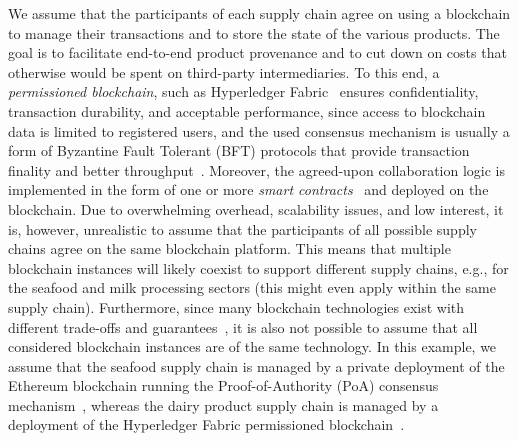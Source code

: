 \documentclass[review]{elsarticle}
\begin{document}
We assume that the participants of each supply chain agree on using a blockchain to manage their transactions and to store the state of the various products.
The goal is to facilitate end-to-end product provenance and to cut down on costs that otherwise would be spent on third-party intermediaries.
To this end, a \emph{permissioned blockchain}, such as Hyperledger Fabric~\cite{Androulaki2018Fabric} ensures confidentiality, transaction durability, and acceptable performance, since access to blockchain data is limited to registered users, and the used consensus mechanism is usually a form of Byzantine Fault Tolerant (BFT) protocols that provide transaction finality and better throughput~\cite{cachin2017consensus}.
Moreover, the agreed-upon collaboration logic is implemented in the form of one or more \emph{smart contracts}~\cite{wood2021ethereum} and deployed on the blockchain.
Due to overwhelming overhead, scalability issues, and low interest, it is, however, unrealistic to assume that the participants of all possible supply chains agree on the same blockchain platform.
This means that multiple blockchain instances will likely coexist to support different supply chains, e.g., for the seafood and milk processing sectors (this might even apply within the same supply chain).
Furthermore, since many blockchain technologies exist with different trade-offs and guarantees~\cite{Falazi2019_TransactionalPropertiesBlockchains}, it is also not possible to assume that all considered blockchain instances are of the same technology.
In this example, we assume that the seafood supply chain is managed by a  private deployment of the Ethereum blockchain running the Proof-of-Authority (PoA) consensus mechanism~\cite{Szilagyi2017Clique}, whereas the dairy product supply chain is managed by a deployment of the Hyperledger Fabric permissioned blockchain~\cite{Androulaki2018Fabric}. 
\end{document}
